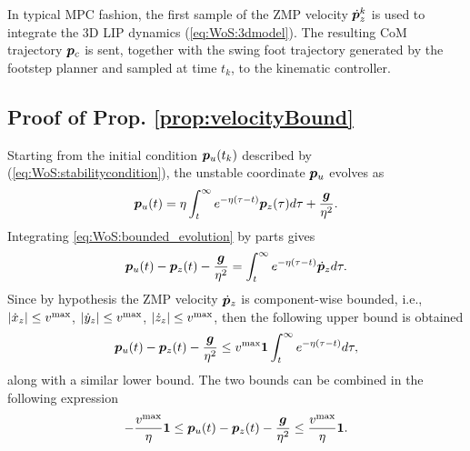 In typical MPC fashion, the first sample of the ZMP velocity $\dot {{\bm{p}}}_z^k$ is used to integrate the 3D LIP dynamics (\ref{eq:WoS:3dmodel}). The resulting CoM trajectory ${\bm{p}}_c$ is sent, together with the swing foot trajectory generated by the footstep planner and sampled at time $t_k$, to the kinematic controller.

\subsection{Proof of Prop. \ref{prop:velocityBound}}
\label{sec:WoS:Proof}

Starting from the initial condition ${\bm{p}}_u(t_k)$ described by (\ref{eq:WoS:stabilitycondition}), the unstable coordinate ${\bm{p}}_u$ evolves as
\begin{equation}
\label{eq:WoS:bounded_evolution}
{\bm{p}}_u(t) = \eta\int_{t}^\infty e^{-\eta(\tau-t)}{\bm{p}}_z(\tau) d\tau + \frac{{\bm{g}}}{\eta^2}.
\end{equation}
Integrating \ref{eq:WoS:bounded_evolution} by parts gives
\begin{equation}
\label{eq:WoS:bounded_evolution_integrated}
{\bm{p}}_u(t) - {\bm{p}}_z(t) - \frac{{\bm{g}}}{\eta^2} = \int_{t}^\infty e^{-\eta(\tau-t)}\dot{{\bm{p}}}_z d\tau.
\end{equation}
Since by hypothesis the ZMP velocity $\dot{{\bm{p}}}_z$ is component-wise bounded, i.e., $|\dot x_z| \le v^{\rm max}$, $|\dot y_z| \le v^{\rm max}$, $|\dot z_z| \le v^{\rm max}$, then the following upper bound is obtained
\begin{equation*}
{\bm{p}}_u(t) - {\bm{p}}_z(t) - \frac{{\bm{g}}}{\eta^2} \leq v^{\rm max}{\bf 1}\int_{t}^\infty e^{-\eta(\tau-t)}  d\tau,
\end{equation*}
along with a similar lower bound.
The two bounds can be combined in the following expression
\begin{equation}
\label{eq:WoS:bound unstable}
-\frac{v^{\rm max}}{\eta}{\bf 1}
\le
{\bm{p}}_u(t) - {\bm{p}}_z(t) - \frac{{\bm{g}}}{\eta^2}
\le
\frac{v^{\rm max}}{\eta}{\bf 1}.
\end{equation}

